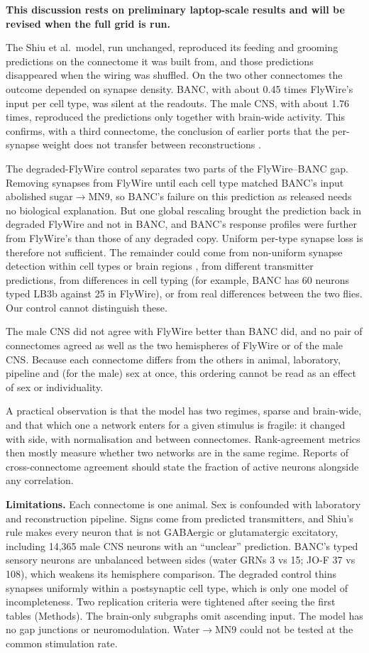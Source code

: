 \textbf{This discussion rests on preliminary laptop-scale results and will be revised when
the full grid is run.} 

The Shiu et al.\ model, run unchanged, reproduced its feeding and grooming predictions on the
connectome it was built from, and those predictions disappeared when the wiring was shuffled.
On the two other connectomes the outcome depended on synapse density. BANC, with about
0.45 times FlyWire's input per cell type, was silent at the readouts. The male CNS, with
about 1.76 times, reproduced the predictions only together with brain-wide activity. This
confirms, with a third connectome, the conclusion of earlier ports that the per-synapse
weight does not transfer between reconstructions \citep{santos2026,brainlab2026,fugsukjit2026}.

The degraded-FlyWire control separates two parts of the FlyWire--BANC gap. Removing synapses
from FlyWire until each cell type matched BANC's input abolished sugar$\to$MN9, so BANC's
failure on this prediction as released needs no biological explanation. But one global
rescaling brought the prediction back in degraded FlyWire and not in BANC, and BANC's
response profiles were further from FlyWire's than those of any degraded copy. Uniform
per-type synapse loss is therefore not sufficient. The remainder could come from
non-uniform synapse detection within cell types or brain regions \citep{santos2026}, from
different transmitter predictions, from differences in cell typing (for example, BANC has
60 neurons typed LB3b against 25 in FlyWire), or from real differences between the two
flies. Our control cannot distinguish these.

The male CNS did not agree with FlyWire better than BANC did, and no pair of connectomes
agreed as well as the two hemispheres of FlyWire or of the male CNS. Because each connectome
differs from the others in animal, laboratory, pipeline and (for the male) sex at once, this
ordering cannot be read as an effect of sex or individuality.

A practical observation is that the model has two regimes, sparse and brain-wide, and that
which one a network enters for a given stimulus is fragile: it changed with side, with
normalisation and between connectomes. Rank-agreement metrics then mostly measure whether
two networks are in the same regime. Reports of cross-connectome agreement should state the
fraction of active neurons alongside any correlation.

\textbf{Limitations.} Each connectome is one animal. Sex is confounded with laboratory and
reconstruction pipeline. Signs come from predicted transmitters, and Shiu's rule makes every
neuron that is not GABAergic or glutamatergic excitatory, including 14{,}365 male CNS neurons
with an ``unclear'' prediction. BANC's typed sensory neurons are unbalanced between sides
(water GRNs 3 vs 15; JO-F 37 vs 108), which weakens its hemisphere comparison. The degraded
control thins synapses uniformly within a postsynaptic cell type, which is only one model of
incompleteness. Two replication criteria were tightened after seeing the first tables
(Methods). The brain-only subgraphs omit ascending input. The model has no gap junctions or
neuromodulation. Water$\to$MN9 could not be tested at the common stimulation rate.
